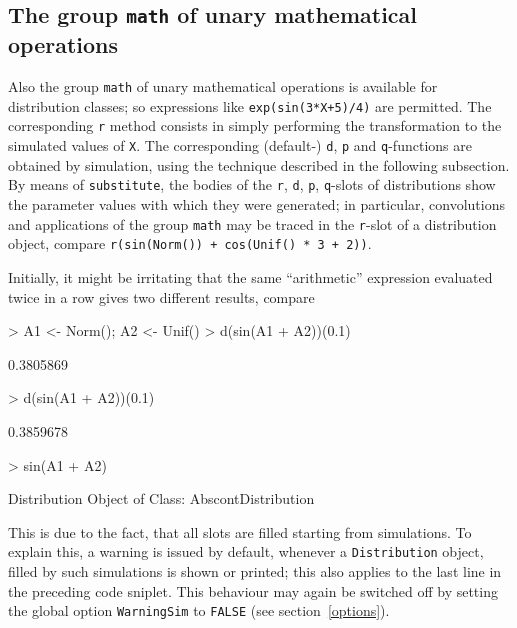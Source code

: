 \documentclass[11pt]{article}
\newcommand{\code}[1]{{\tt #1}}
\begin{document}
\subsection[The group math of unary mathematical operations]{The group
\code{math} of unary mathematical operations}
%
Also the group \code{math} of unary mathematical operations is available for
distribution classes; so
expressions like \code{exp(sin(3*X+5)/4)} are permitted.
%
 The corresponding \code{r} method consists in simply
performing the transformation to the simulated values of \code{X}.
The corresponding (default-) \code{d}, \code{p} and \code{q}-functions are
obtained by simulation, using the technique described in the following
subsection.\\
By means of \code{substitute}, the bodies of the \code{r}, \code{d},
\code{p}, \code{q}-slots of distributions show the parameter values with
which they were generated; in particular,
convolutions and applications of the group \code{math} may be traced in
the \code{r}-slot of a distribution object, compare\newline
\code{r(sin(Norm()) + cos(Unif() * 3 + 2))}.

Initially, it might be irritating that the same ``arithmetic'' expression
evaluated twice in a row gives two different results, compare
\begin{Schunk}
\begin{Sinput}
>   A1 <- Norm(); A2 <- Unif()
>   d(sin(A1 + A2))(0.1)
\end{Sinput}
\begin{Soutput}
[1] 0.3805869
\end{Soutput}
\begin{Sinput}
>   d(sin(A1 + A2))(0.1)
\end{Sinput}
\begin{Soutput}
[1] 0.3859678
\end{Soutput}
\begin{Sinput}
>   sin(A1 + A2)
\end{Sinput}
\begin{Soutput}
Distribution Object of Class: AbscontDistribution
\end{Soutput}
\end{Schunk}
This is due to the fact, that all slots are filled starting from simulations.
To explain this, a warning is issued  by default, whenever a \code{Distribution}
object, filled by such simulations is shown or printed; this also applies to the
last line in the preceding code sniplet. This behaviour may again be switched
off by setting the global option
\code{WarningSim} to \code{FALSE} (see section~\ref{options}).\\
\end{document}
